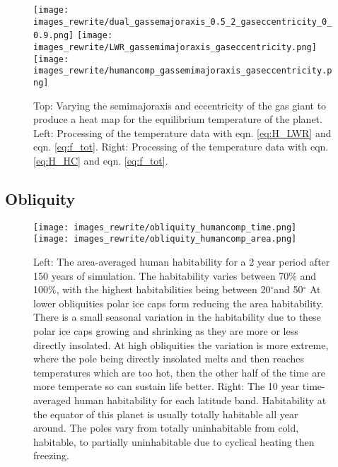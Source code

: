 \documentclass[12pt, onecolumn]{revtex4-2}    %
\newcommand{\degrees}{\ensuremath{^{\circ}}}
\begin{document}
\begin{figure}
  \texttt{[image: images\_rewrite/dual\_gassemajoraxis\_0.5\_2\_gaseccentricity\_0\_0.9.png]}
  \texttt{[image: images\_rewrite/LWR\_gassemimajoraxis\_gaseccentricity.png]}
  \texttt{[image: images\_rewrite/humancomp\_gassemimajoraxis\_gaseccentricity.png]}
  \caption{
    Top: Varying the semimajoraxis and eccentricity of the gas giant to produce a heat map for the equilibrium temperature of the planet.
    Left: Processing of the temperature data with eqn. \eqref{eq:H_LWR} and eqn. \eqref{eq:f_tot}.
    Right: Processing of the temperature data with eqn. \eqref{eq:H_HC} and eqn. \eqref{eq:f_tot}.
  }
  \label{fig:qualitative_semimajoraxis_eccentricity}
\end{figure}



\subsection{Obliquity} \label{ssec:qualitative_obliquity}
\begin{figure}
  \texttt{[image: images\_rewrite/obliquity\_humancomp\_time.png]}
  \texttt{[image: images\_rewrite/obliquity\_humancomp\_area.png]}
  \caption{
    Left: The area-averaged human habitability for a 2 year period after 150 years of simulation.
    The habitability varies between 70\% and 100\%, with the highest habitabilities being between 20\degrees and 50\degrees
    At lower obliquities polar ice caps form reducing the area habitability.
    There is a small seasonal variation in the habitability due to these polar ice caps growing and shrinking as they are more or less directly insolated.
    At high obliquities the variation is more extreme, where the pole being directly insolated melts and then reaches temperatures which are too hot, then the other half of the time are more temperate so can sustain life better.
    Right: The 10 year time-averaged human habitability for each latitude band.
    Habitability at the equator of this planet is usually totally habitable all year around.
    The poles vary from totally uninhabitable from cold, habitable, to partially uninhabitable due to cyclical heating then freezing.
  }
  \label{fig:qualitative_obliquity}
\end{figure}

\end{document}
